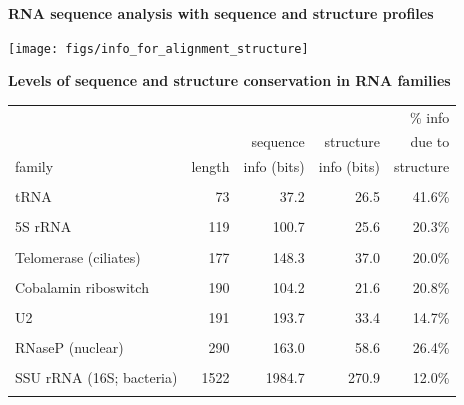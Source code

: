 \documentclass[landscape]{slides}
\begin{document}
\begin{slide}
\begin{center}
\textbf{RNA sequence analysis with sequence and structure profiles}
\end{center}
\medskip

\begin{center}
\texttt{[image: figs/info\_for\_alignment\_structure]}
\end{center}

\end{slide}

\begin{slide}
\begin{center}
\textbf{Levels of sequence and structure conservation in RNA families}
\end{center}
\medskip


\begin{center}
\small
\begin{tabular}{lrrrr} 
         &        &             &              & \% info \\
         &        & sequence    & structure    & due to  \\
  family & length & info (bits) & info (bits)  & structure \\ \hline
  \\
  tRNA   & 73     & 37.2      & 26.5         & 41.6\%    \\ 
  \\
  5S rRNA& 119    & 100.7     & 25.6         & 20.3\%    \\ 
  \\
  Telomerase (ciliates) & 177 & 148.3 & 37.0     & 20.0\%    \\
  \\
  Cobalamin riboswitch & 190 & 104.2 & 21.6      & 20.8\%    \\
  \\
  U2     & 191    & 193.7     & 33.4         & 14.7\%    \\ 
  \\
  RNaseP (nuclear) & 290    & 163.0     & 58.6 & 26.4\%    \\ 
  \\
  SSU rRNA (16S; bacteria) & 1522 & 1984.7 & 270.9      &  12.0\% \\
  \\
\end{tabular}
\end{center}

\vfill

\end{slide}
\end{document}
